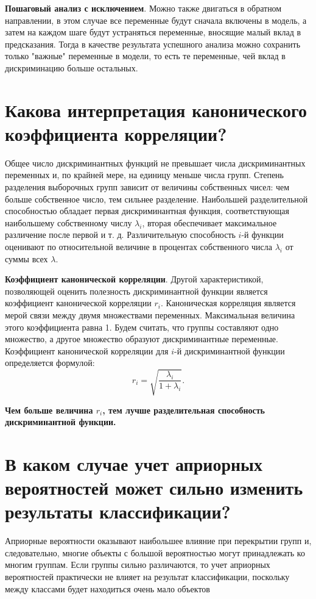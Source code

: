 \documentclass[a4paper, 12pt]{article}
\begin{document}
\textbf{Пошаговый анализ с исключением}. Можно также двигаться в обратном направлении, в этом случае все переменные будут сначала включены в модель, а затем на каждом шаге будут устраняться переменные, вносящие малый вклад в предсказания. Тогда в качестве результата успешного анализа можно сохранить только "важные" переменные в модели, то есть те переменные, чей вклад в дискриминацию больше остальных.

\section{Какова интерпретация канонического коэффициента корреляции?}
Общее число дискриминантных функций не превышает числа дискриминантных переменных и, по крайней мере, на единицу меньше числа групп. Степень разделения выборочных групп зависит от величины собственных чисел: чем больше собственное число, тем сильнее разделение. Наибольшей разделительной способностью обладает первая дискриминантная функция, соответствующая наибольшему собственному числу $\lambda_i$, вторая обеспечивает максимальное различение после первой и т. д. Различительную способность $i$-й функции оценивают по относительной величине в процентах собственного числа  $\lambda_i$ от суммы всех  $\lambda$.

\textbf{Коэффициент канонической корреляции}. Другой характеристикой, позволяющей оценить полезность дискриминантной функции является коэффициент канонической корреляции  $r_i$. Каноническая корреляция является мерой связи между двумя множествами переменных. Максимальная величина этого коэффициента равна 1. Будем считать, что группы составляют одно множество, а другое множество образуют дискриминантные переменные. Коэффициент канонической корреляции для $i$-й дискриминантной функции определяется формулой: $$r_i = \sqrt{\dfrac{\lambda_i}{1+\lambda_i}}.$$

\textbf{Чем больше величина  $r_i$, тем лучше разделительная способность дискриминантной функции.}

\section{В каком случае учет априорных вероятностей может сильно изменить результаты классификации?}
Априорные вероятности оказывают наибольшее влияние при перекрытии групп и, следовательно, многие объекты с большой вероятностью могут принадлежать ко многим группам. Если группы сильно различаются, то учет априорных вероятностей практически не влияет на результат классификации, поскольку между классами будет находиться очень мало объектов
\end{document}
